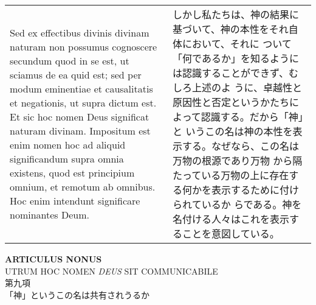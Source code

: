 \documentclass[10pt]{jsarticle}
\begin{document}
\begin{longtable}{p{21em}p{21em}}
Sed ex effectibus divinis divinam naturam non possumus cognoscere
secundum quod in se est, ut sciamus de ea quid est; sed per modum
eminentiae et causalitatis et negationis, ut supra dictum est. Et sic
hoc nomen Deus significat naturam divinam. Impositum est enim nomen
hoc ad aliquid significandum supra omnia existens, quod est principium
omnium, et remotum ab omnibus. Hoc enim intendunt significare
nominantes Deum.

&

しかし私たちは、神の結果に基づいて、神の本性をそれ自体において、それに
ついて「何であるか」を知るようには認識することができず、むしろ上述のよ
うに、卓越性と原因性と否定というかたちによって認識する。だから「神」と
いうこの名は神の本性を表示する。なぜなら、この名は万物の根源であり万物
から隔たっている万物の上に存在する何かを表示するために付けられているか
らである。神を名付ける人々はこれを表示することを意図している。

\end{longtable}
\newpage
{}

\begin{center}
{\Large {\bf ARTICULUS NONUS}}\\
{\large UTRUM HOC NOMEN {\itshape DEUS} SIT COMMUNICABILE}\\
{\Large 第九項\\「神」というこの名は共有されうるか}
\end{center}
\end{document}
